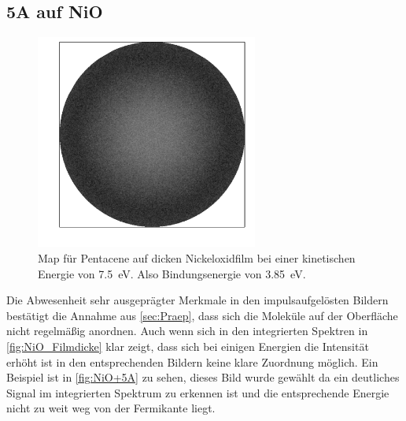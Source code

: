         \subsection{5A auf NiO}
            \begin{figure}
                \centering
                \includegraphics[width=0.65\textwidth]{./content/pictures/NiO+5A/NiO_thick_5A_KE12_7.png}
                \caption{Map für Pentacene auf dicken Nickeloxidfilm bei einer kinetischen Energie von \SI{7.5}{\electronvolt}. Also Bindungsenergie von \SI{3.85}{\electronvolt}.}
                \label{fig:NiO+5A}
            \end{figure}
            Die Abwesenheit sehr ausgeprägter Merkmale in den impulsaufgelösten Bildern bestätigt die Annahme aus \autoref{sec:Praep}, dass sich die Moleküle auf der Oberfläche nicht regelmäßig anordnen.
            Auch wenn sich in den integrierten Spektren in \autoref{fig:NiO_Filmdicke} klar zeigt, dass sich bei einigen Energien die Intensität erhöht ist in den entsprechenden Bildern keine klare Zuordnung möglich.
            Ein Beispiel ist in \autoref{fig:NiO+5A} zu sehen, dieses Bild wurde gewählt da ein deutliches Signal im integrierten Spektrum zu erkennen ist und die entsprechende Energie nicht zu weit weg von der Fermikante liegt.

